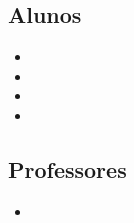 

\subsection*{Alunos} %
\label{sub:alunos}
\begin{itemize}
	\item \Eduardo
	\item \Rafael
	\item \thabata
	\item \Thiago
\end{itemize}

\subsection*{Professores} %
\label{sub:professores}

\begin{itemize}
	\item \professora
\end{itemize}
